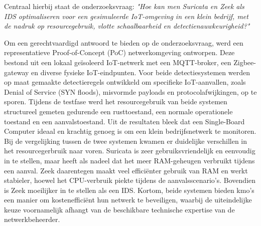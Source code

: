 Centraal hierbij staat de onderzoeksvraag: \textit{"Hoe kan men Suricata en Zeek als IDS optimaliseren voor een gesimuleerde IoT-omgeving in een klein bedrijf, met de nadruk op resourcegebruik, vlotte schaalbaarheid en detectienauwkeurigheid?"}

Om een gerechtvaardigd antwoord te bieden op de onderzoeksvraag, werd een representatieve Proof-of-Concept (PoC) netwerkomgeving ontworpen. Deze bestond uit een lokaal geïsoleerd IoT-netwerk met een MQTT-broker, een Zigbee-gateway en diverse fysieke IoT-eindpunten. Voor beide detectiesystemen werden op maat gemaakte detectieregels ontwikkeld om specifieke IoT-aanvallen, zoals Denial of Service (SYN floods), misvormde payloads en protocolafwijkingen, op te sporen. Tijdens de testfase werd het resourcegebruik van beide systemen structureel gemeten gedurende een rusttoestand, een normale operationele toestand en een aanvalstoestand.
Uit de resultaten bleek dat een Single-Board Computer ideaal en krachtig genoeg is om een klein bedrijfsnetwerk te monitoren. Bij de vergelijking tussen de twee systemen kwamen er duidelijke verschillen in het resourcegerbruik naar voren. Suricata is zeer gebruiksvriendelijk en eenvoudig in te stellen, maar heeft als nadeel dat het meer RAM-geheugen verbruikt tijdens een aanval. Zeek daarentegen maakt veel efficiënter gebruik van RAM en werkt stabieler, hoewel het CPU-verbruik piekte tijdens de aanvalsscenario’s. Bovendien is Zeek moeilijker in te stellen als een IDS. Kortom, beide systemen bieden kmo’s een manier om kostenefficiënt hun netwerk te beveiligen, waarbij de uiteindelijke keuze voornamelijk afhangt van de beschikbare technische expertise van de netwerkbeheerder.

